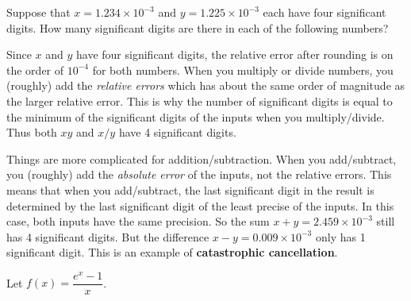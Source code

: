 \documentclass[11pt]{exam}
\begin{document}
\begin{questions}
\question Suppose that $x = 1.234 \times 10^{-3}$ and $y = 1.225 \times 10^{-3}$ each have four significant digits.  How many significant digits are there in each of the following numbers? 
\begin{solution}
Since $x$ and $y$ have four significant digits, the relative error after rounding is on the order of $10^{-4}$ for both numbers.  When you multiply or divide numbers, you (roughly) add the \emph{relative errors} which has about the same order of magnitude as the larger relative error.  This is why the number of significant digits is equal to the minimum of the significant digits of the inputs when you multiply/divide. Thus both $xy$ and $x/y$ have 4 significant digits. 

Things are more complicated for addition/subtraction.  When you add/subtract, you (roughly) add the \emph{absolute error} of the inputs, not the relative errors.  This means that when you add/subtract, the last significant digit in the result is determined by the last significant digit of the least precise of the inputs.  In this case, both inputs have the same precision.  So the sum $x+y=2.459 \times 10^{-3}$ still has 4 significant digits.  But the difference $x-y = 0.009 \times 10^{-3}$ only has 1 significant digit.  This is an example of \textbf{catastrophic cancellation}. 
\end{solution}

\question Let $f(x) = \dfrac{e^x - 1}{x}$.  
\end{questions}
\end{document}
